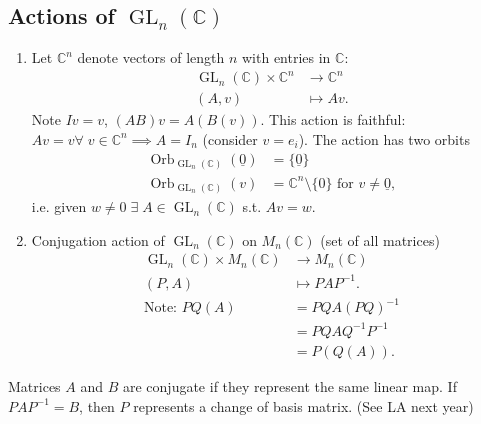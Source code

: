 \subsection{Actions of $\operatorname{GL}_n(\mathbb{C})$}

\begin{enumerate}
    \item Let $\mathbb{C}^n$ denote vectors of length $n$ with entries in $\mathbb{C}$:
    \begin{align*}
        \operatorname{GL}_n(\mathbb{C}) \times \mathbb{C}^n &\to \mathbb{C}^n \\
        (A, v) &\mapsto Av.
    \end{align*} 
    Note $Iv = v$, $(AB)v = A(B(v))$.
    This action is faithful: $Av = v \forall \; v \in \mathbb{C}^n \implies A = I_n$ (consider $v = e_i$).
    The action has two orbits
    \begin{align*}
        \operatorname{Orb}_{\operatorname{GL}_n(\mathbb{C})}(\underline{0}) &= \{\underline{0}\} \\
        \operatorname{Orb}_{\operatorname{GL}_n(\mathbb{C})}(v) &= \mathbb{C}^n \setminus \{0\} \text{ for } v \neq \underline{0},
    \end{align*} i.e. given $w \neq 0 \; \exists \; A \in \operatorname{GL}_n(\mathbb{C})$ s.t. $Av = w$.
    \item Conjugation action of $\operatorname{GL}_n(\mathbb{C})$ on $M_n(\mathbb{C})$ (set of all matrices)
    \begin{align*}
        \operatorname{GL}_n(\mathbb{C}) \times M_n(\mathbb{C}) &\to M_n(\mathbb{C}) \\
        (P, A) &\mapsto P A P^{-1}. \\
    \text{Note: } PQ(A) &= PQ A (PQ)^{-1} \\
        &= PQ A Q^{-1} P^{-1} \\
        &= P(Q(A)).
    \end{align*} 
\end{enumerate} 

\begin{remark}
    Matrices $A$ and $B$ are conjugate if they represent the same linear map. 
    If $PAP^{-1} = B$, then $P$ represents a change of basis matrix. (See LA next year)
\end{remark} 


